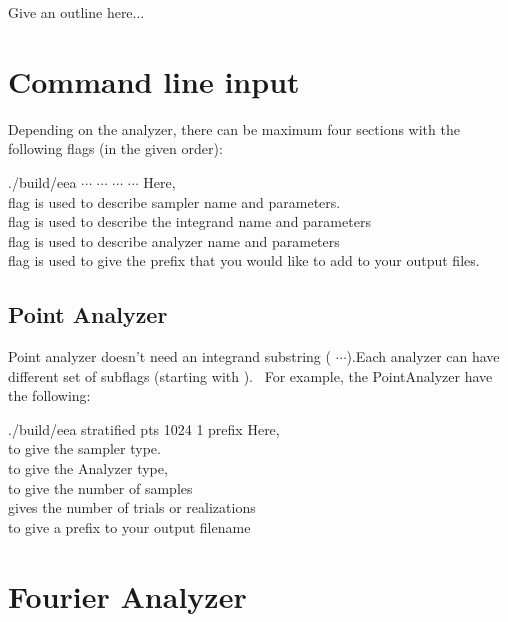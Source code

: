 \documentclass[11pt,fleqn]{book} %
\begin{document}
 Give an outline here...
 
 \section{Command line input}
 Depending on the analyzer, there can be maximum four sections with the following flags (in the given order):
\begin{tcolorbox}
./build/eea  $\cdots$  $\cdots$  $\cdots$   $\cdots$
\tcblower
Here, \\
 flag is used to describe sampler name and  parameters. \\
 flag is used to describe the integrand name and parameters \\
 flag is used to describe analyzer name and parameters \\
 flag is used to give the prefix that you would like to add to your output files.
\end{tcolorbox}
 
\subsection{Point Analyzer}
Point analyzer doesn't need an integrand substring ( $\cdots$).Each analyzer can have different set of subflags (starting with \cdashs). \
For example, the PointAnalyzer have the following:
%
\begin{tcolorbox}
./build/eea   stratified   pts  1024  1   prefix
\tcblower
Here, \\
 to give the sampler type. \\
 to give the Analyzer type, \\
 to give the number of samples \\
 gives the number of trials or realizations \\
 to give a prefix to your output filename
\end{tcolorbox}
%
\section{Fourier Analyzer}
 
\end{document}
